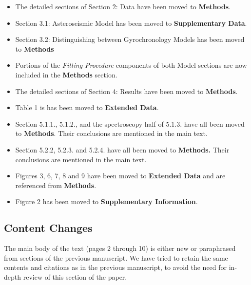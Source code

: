 \documentclass[11pt]{article}
\begin{document}
\begin{itemize}
	\item The detailed sections of Section 2: Data have been moved to \textbf{Methods}.
	\item Section 3.1: Asteroseismic Model has been moved to \textbf{Supplementary Data}.
	\item Section 3.2: Distinguishing between Gyrochronology Models has been moved to \textbf{Methods}
	\item Portions of the \textit{Fitting Procedure} components of both Model sections are now included in the \textbf{Methods} section.
	\item The detailed sections of Section 4: Results have been moved to \textbf{Methods}.
	\item Table 1 is has been moved to \textbf{Extended Data}.
	\item Section 5.1.1., 5.1.2., and the spectroscopy half of 5.1.3. have all been moved to \textbf{Methods}. Their conclusions are mentioned in the main text.
	\item Section 5.2.2, 5.2.3. and 5.2.4. have all been moved to \textbf{Methods.} Their conclusions are mentioned in the main text.
	\item Figures 3, 6, 7, 8 and 9 have been moved to \textbf{Extended Data} and are referenced from \textbf{Methods}.
	\item Figure 2 has been moved to \textbf{Supplementary Information}.
\end{itemize}

\subsection*{Content Changes}
The main body of the text (pages 2 through 10) is either new or paraphrased from sections of the previous manuscript. We have tried to retain the same contents and citations as in the previous manuscript, to avoid the need for in-depth review of this section of the paper.
\end{document}
